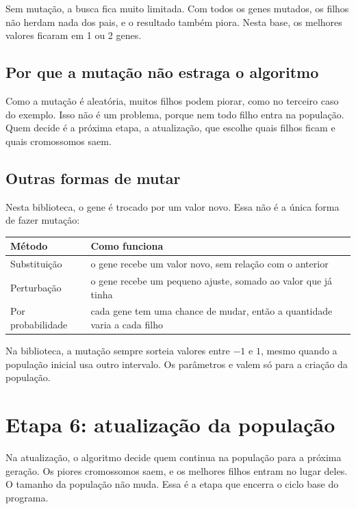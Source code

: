 \documentclass[11pt,a4paper]{article}
\newcommand{\code}[1]{\texttt{\detokenize{#1}}}
\newenvironment{tabela}{\par\nopagebreak[4]\vspace{0.3em}\nopagebreak[4]\begingroup\centering\small}{\par\endgroup\vspace{0.6em}}
\begin{document}
Sem mutação, a busca fica muito limitada. Com todos os genes mutados, os filhos não herdam nada dos pais, e o resultado também piora. Nesta base, os melhores valores ficaram em 1 ou 2 genes.

\subsection{Por que a mutação não estraga o algoritmo}

Como a mutação é aleatória, muitos filhos podem piorar, como no terceiro caso do exemplo. Isso não é um problema, porque nem todo filho entra na população. Quem decide é a próxima etapa, a atualização, que escolhe quais filhos ficam e quais cromossomos saem.

\subsection{Outras formas de mutar}

Nesta biblioteca, o gene é trocado por um valor novo. Essa não é a única forma de fazer mutação:

\begin{tabela}
\begin{tabularx}{\linewidth}{lL}
\toprule
Método & Como funciona\\
\midrule
Substituição & o gene recebe um valor novo, sem relação com o anterior\\
Perturbação & o gene recebe um pequeno ajuste, somado ao valor que já tinha\\
Por probabilidade & cada gene tem uma chance de mudar, então a quantidade varia a cada filho\\
\bottomrule
\end{tabularx}
\end{tabela}

\begin{nota}
Na biblioteca, a mutação sempre sorteia valores entre $-1$ e $1$, mesmo quando a população inicial usa outro intervalo. Os parâmetros \code{minimo} e \code{maximo} valem só para a criação da população.
\end{nota}

\clearpage
\section{Etapa 6: atualização da população}

Na atualização, o algoritmo decide quem continua na população para a próxima geração. Os piores cromossomos saem, e os melhores filhos entram no lugar deles. O tamanho da população não muda. Essa é a etapa que encerra o ciclo base do programa.
\end{document}
